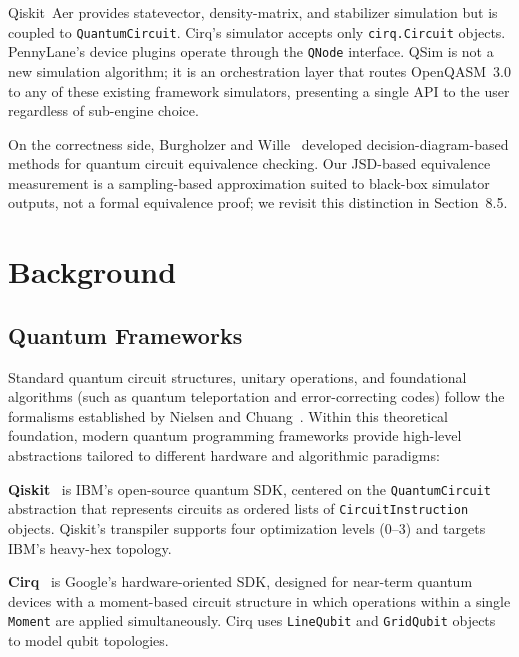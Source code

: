 \documentclass[runningheads]{llncs}
\begin{document}
Qiskit~Aer provides statevector, density-matrix, and stabilizer simulation but is coupled to \texttt{QuantumCircuit}. Cirq's simulator accepts only \texttt{cirq.Circuit} objects. PennyLane's device plugins operate through the \texttt{QNode} interface. QSim is not a new simulation algorithm; it is an orchestration layer that routes OpenQASM~3.0 to any of these existing framework simulators, presenting a single API to the user regardless of sub-engine choice.

On the correctness side, Burgholzer and Wille~\cite{burgholzer2020} developed decision-diagram-based methods for quantum circuit equivalence checking. Our JSD-based equivalence measurement is a sampling-based approximation suited to black-box simulator outputs, not a formal equivalence proof; we revisit this distinction in Section~8.5.

\FloatBarrier


\section{Background}

\subsection{Quantum Frameworks}

Standard quantum circuit structures, unitary operations, and foundational algorithms (such as quantum teleportation and error-correcting codes) follow the formalisms established by Nielsen and Chuang~\cite{nielsen2010}. Within this theoretical foundation, modern quantum programming frameworks provide high-level abstractions tailored to different hardware and algorithmic paradigms:

\textbf{Qiskit}~\cite{qiskit2023} is IBM's open-source quantum SDK, centered on the \texttt{QuantumCircuit} abstraction that represents circuits as ordered lists of \texttt{CircuitInstruction} objects. Qiskit's transpiler supports four optimization levels (0--3) and targets IBM's heavy-hex topology.

\textbf{Cirq}~\cite{cirq2024} is Google's hardware-oriented SDK, designed for near-term quantum devices with a moment-based circuit structure in which operations within a single \texttt{Moment} are applied simultaneously. Cirq uses \texttt{LineQubit} and \texttt{GridQubit} objects to model qubit topologies.
\end{document}
